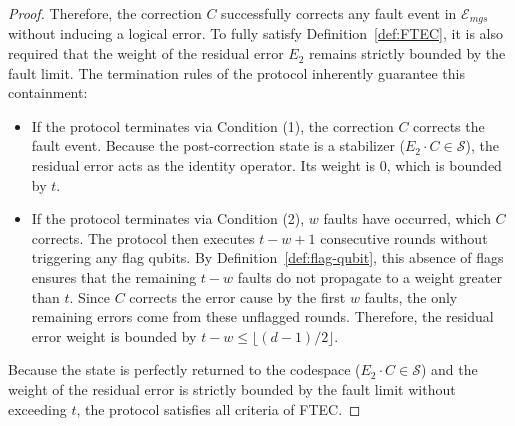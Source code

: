 \documentclass[acmsmallw,review]{acmart}
\begin{document}
\begin{proof}
Therefore, the correction $C$ successfully corrects any fault event in $\mathcal{E}_{mgs}$ without inducing a logical error. To fully satisfy Definition~\ref{def:FTEC}, it is also required that the weight of the residual error $E_2$ remains strictly bounded by the fault limit. The termination rules of the protocol inherently guarantee this containment:
\begin{itemize}
    \item If the protocol terminates via Condition (1), the correction $C$ corrects the fault event. Because the post-correction state is a stabilizer ($E_2 \cdot C \in \mathcal{S}$), the residual error acts as the identity operator. Its weight is $0$, which is bounded by $t$.
    \item If the protocol terminates via Condition (2), $w$ faults have occurred, which $C$ corrects. The protocol then executes $t-w+1$ consecutive rounds without triggering any flag qubits. By Definition~\ref{def:flag-qubit}, this absence of flags ensures that the remaining $t-w$ faults do not propagate to a weight greater than $t$. Since $C$ corrects the error cause by the first $w$ faults, the only remaining errors come from these unflagged rounds. Therefore, the residual error weight is bounded by $t-w \leq \lfloor (d-1)/2 \rfloor$.
\end{itemize}
Because the state is perfectly returned to the codespace ($E_2 \cdot C \in \mathcal{S}$) and the weight of the residual error is strictly bounded by the fault limit without exceeding $t$, the protocol satisfies all criteria of FTEC.
\end{proof}
\end{document}
